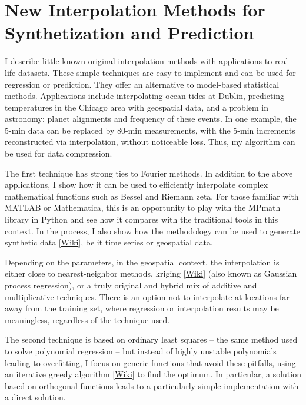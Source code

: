 \documentclass[oneside,10pt]{book}
\newcommand\Chapter[2]{
  \chapter[#1]{#1\\[2ex]\Large\itshape#2}
}
\begin{document}
\Chapter{New Interpolation Methods  for Synthetization and Prediction}{}\label{chapterInterpol}


  I describe little-known original interpolation methods with applications to real-life datasets. These simple techniques are easy to implement and can be used for regression or prediction. They offer an alternative to model-based statistical methods. Applications include interpolating ocean tides at Dublin, predicting temperatures in the Chicago area with geospatial data, and a problem in astronomy:  planet alignments and frequency of these events. In one example, the 5-min data can be replaced by 80-min measurements, with the 5-min increments reconstructed via interpolation, without noticeable loss. Thus, my algorithm can be used for data compression. 

The first technique has strong ties to Fourier methods. In addition to the above applications, I show how it can be used to efficiently interpolate complex mathematical functions such as Bessel and Riemann zeta. For those familiar with MATLAB or Mathematica, this is an opportunity to play with the MPmath library in Python and see how it compares with the traditional tools in this context. 
In the process, I also show how the methodology can be used to 
generate \textcolor{index}{synthetic data} [\href{https://en.wikipedia.org/wiki/Synthetic_data}{Wiki}], be it time series or geospatial data.

Depending on the parameters, in the geospatial context, the interpolation is either close to nearest-neighbor methods, 
\textcolor{index}{kriging} [\href{https://en.wikipedia.org/wiki/Kriging}{Wiki}] (also known as Gaussian process regression), or a truly original and hybrid mix of additive and multiplicative techniques. There is an option not to interpolate at locations far away from the training set, where regression or interpolation results may be meaningless, regardless of the technique used. 

The second technique is based on ordinary least squares -- the same method used to solve polynomial regression -- but instead of highly unstable polynomials leading to overfitting, I focus on generic functions that avoid these pitfalls, using an iterative 
\textcolor{index}{greedy algorithm} [\href{https://en.wikipedia.org/wiki/Greedy_algorithm}{Wiki}] to find the optimum. In particular, a solution based on orthogonal functions leads to a particularly simple implementation with a direct solution.
\end{document}
